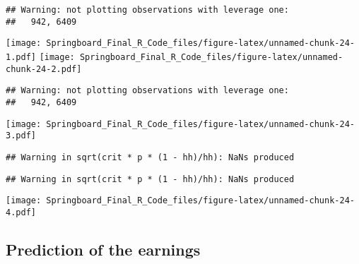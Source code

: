 \documentclass[]{article}
\newenvironment{Shaded}{\begin{snugshade}}{\end{snugshade}}
\newcommand{\CommentTok}[1]{\textcolor[rgb]{0.56,0.35,0.01}{\textit{#1}}}
\begin{document}
\begin{verbatim}
## Warning: not plotting observations with leverage one:
##   942, 6409
\end{verbatim}

\texttt{[image: Springboard\_Final\_R\_Code\_files/figure-latex/unnamed-chunk-24-1.pdf]}
\texttt{[image: Springboard\_Final\_R\_Code\_files/figure-latex/unnamed-chunk-24-2.pdf]}

\begin{verbatim}
## Warning: not plotting observations with leverage one:
##   942, 6409
\end{verbatim}

\texttt{[image: Springboard\_Final\_R\_Code\_files/figure-latex/unnamed-chunk-24-3.pdf]}

\begin{verbatim}
## Warning in sqrt(crit * p * (1 - hh)/hh): NaNs produced
\end{verbatim}

\begin{verbatim}
## Warning in sqrt(crit * p * (1 - hh)/hh): NaNs produced
\end{verbatim}

\texttt{[image: Springboard\_Final\_R\_Code\_files/figure-latex/unnamed-chunk-24-4.pdf]}

\subsection{Prediction of the
earnings}\label{prediction-of-the-earnings}

\begin{Shaded}
\end{Shaded}
\end{document}
